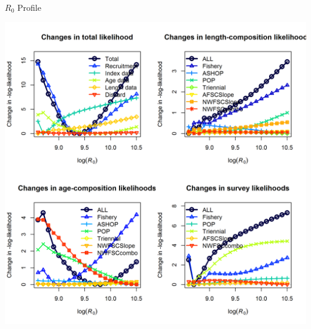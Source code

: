 \documentclass[pdf]{beamer}\usepackage[]{graphicx}\usepackage[]{color}
\begin{document}
\begin{frame}{$R_0$ Profile}
  \begin{center}
    \includegraphics[scale = 0.40]{figures/piner_panel_R0.png}
  \end{center}
\end{frame}
\end{document}
